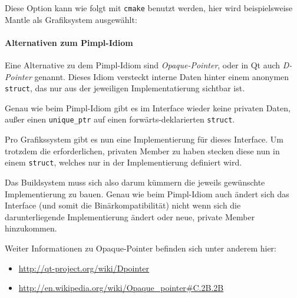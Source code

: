 \documentclass[12pt, a4paper, titlepage, hidelinks]{scrreprt}
\begin{document}

Diese Option kann wie folgt mit \texttt{cmake} benutzt werden, hier wird beispielsweise Mantle als Grafiksystem ausgewählt:

\paragraph{Alternativen zum Pimpl-Idiom}
Eine Alternative zu dem Pimpl-Idiom sind \textit{Opaque-Pointer}, oder in Qt auch \textit{D-Pointer} genannt. Dieses Idiom versteckt interne Daten hinter einem anonymen \texttt{struct}, das nur aus der jeweiligen Implementatierung sichtbar ist. 

Genau wie beim Pimpl-Idiom gibt es im Interface wieder keine privaten Daten, außer einen \texttt{unique\_ptr} auf einen forwärts-deklarierten \texttt{struct}.


Pro Grafikssystem gibt es nun eine Implementierung für dieses Interface. Um trotzdem die erforderlichen, privaten Member zu haben stecken diese nun in einem \texttt{struct}, welches nur in der Implementierung definiert wird.


Das Buildsystem muss sich also darum kümmern die jeweils gewünschte Implementierung zu bauen. Genau wie beim Pimpl-Idiom auch ändert sich das Interface (und somit die Binärkompatibilität) nicht wenn sich die darunterliegende Implementierung ändert oder neue, private Member hinzukommen.

Weiter Informationen zu Opaque-Pointer befinden sich unter anderem hier:
\begin{itemize}
\item \url{http://qt-project.org/wiki/Dpointer}
\item \url{http://en.wikipedia.org/wiki/Opaque_pointer#C.2B.2B}
\end{itemize}
\end{document}
